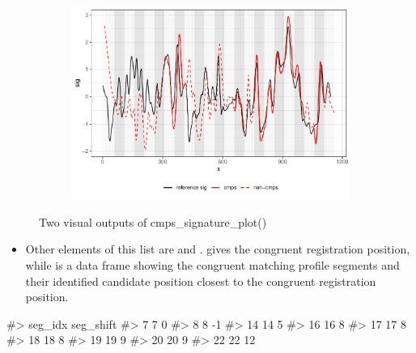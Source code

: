 \begin{figure}[hbt]
\begin{subfigure}[t]{\textwidth}
\begin{adjustbox}{valign=t}
\begin{minipage}{.39\textwidth}
{\small {}
\begin{Schunk}
\end{Schunk}
}
\vspace{1em}
\end{minipage}
\begin{minipage}{.59\textwidth}
\includegraphics[width=\textwidth]{ju-hofmann_files/figure-latex/sigplot2-1.pdf}
\end{minipage}
\end{adjustbox}
\end{subfigure}
\caption{\label{fig:sigplots} Two visual outputs of cmps\_signature\_plot()}
\end{figure}

\begin{itemize}
\tightlist
\item
  Other elements of this list are  and
  .  gives the congruent registration
  position, while  is a data frame showing the
  congruent matching profile segments and their identified candidate
  position closest to the congruent registration position.
\end{itemize}

\begin{Schunk}
\begin{Soutput}
#>    seg_idx seg_shift
#> 7        7         0
#> 8        8        -1
#> 14      14         5
#> 16      16         8
#> 17      17         8
#> 18      18         8
#> 19      19         9
#> 20      20         9
#> 22      22        12
\end{Soutput}
\end{Schunk}

